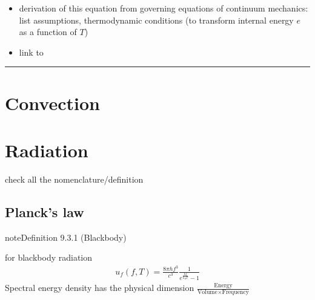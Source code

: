 \documentclass[letterpaper,10pt,english]{jupyterBook}
\begin{document}
\sphinxAtStartPar
{}
\begin{itemize}
\item {} 
\sphinxAtStartPar
derivation of this equation from governing equations of continuum mechanics: list assumptions, thermodynamic conditions (to transform internal energy \(e\) as a function of \(T\))

\item {} 
\sphinxAtStartPar
link to 

\end{itemize}




\bigskip\hrule\bigskip


\sphinxstepscope


\section{Convection}
\label{\detokenize{ch/heat-transfer-convection:convection}}\label{\detokenize{ch/heat-transfer-convection:classical-thermodynamics-heat-transmission-convection}}\label{\detokenize{ch/heat-transfer-convection::doc}}
\sphinxstepscope


\section{Radiation}
\label{\detokenize{ch/heat-transfer-radiation:radiation}}\label{\detokenize{ch/heat-transfer-radiation:classical-thermodynamics-heat-transmission-radiation}}\label{\detokenize{ch/heat-transfer-radiation::doc}}
\sphinxAtStartPar
check all the nomenclature/definition


\subsection{Planck’s law}
\label{\detokenize{ch/heat-transfer-radiation:planck-s-law}}\label{\detokenize{ch/heat-transfer-radiation:classical-thermodynamics-heat-transmission-radiation-planck}}\label{ch/heat-transfer-radiation:definition-0}
\begin{sphinxadmonition}{note}{Definition 9.3.1 (Black\sphinxhyphen{}body)}


\end{sphinxadmonition}

\sphinxAtStartPar
{} for black\sphinxhyphen{}body radiation
\begin{equation*}
\begin{split}u_{f}(f, T) = \frac{8 \pi h f^3}{c^3} \frac{1}{e^{\frac{hf}{k_B T}} - 1}\end{split}
\end{equation*}
\sphinxAtStartPar
Spectral energy density has the physical dimension \(\frac{\text{Energy}}{\text{Volume} \times \text{Frequency}}\)
\end{document}

